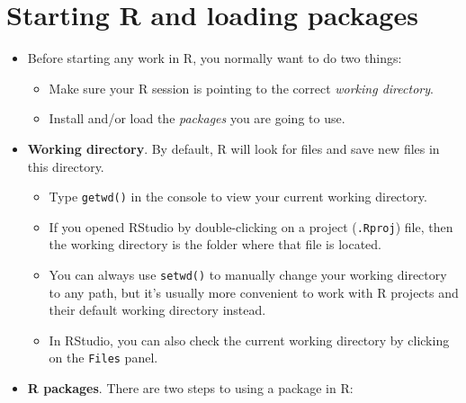 \documentclass[
]{book}
\providecommand{\tightlist}{%
  \setlength{\itemsep}{0pt}\setlength{\parskip}{0pt}}
\begin{document}
\hypertarget{starting-R-and-loading-packages}{%
\section{Starting R and loading packages}\label{starting-R-and-loading-packages}}

\begin{itemize}
\tightlist
\item
  Before starting any work in R, you normally want to do two things:

  \begin{itemize}
  \tightlist
  \item
    Make sure your R session is pointing to the correct \emph{working directory}.
  \item
    Install and/or load the \emph{packages} you are going to use.
  \end{itemize}
\item
  \textbf{Working directory}. By default, R will look for files and save new files in this directory.

  \begin{itemize}
  \tightlist
  \item
    Type \texttt{getwd()} in the console to view your current working directory.
  \item
    If you opened RStudio by double-clicking on a project (\texttt{.Rproj}) file, then the working directory is the folder where that file is located.
  \item
    You can always use \texttt{setwd()} to manually change your working directory to any path, but it's usually more convenient to work with R projects and their default working directory instead.
  \item
    In RStudio, you can also check the current working directory by clicking on the \texttt{Files} panel.
  \end{itemize}
\item
  \textbf{R packages}. There are two steps to using a package in R:


\end{itemize}
\end{document}
